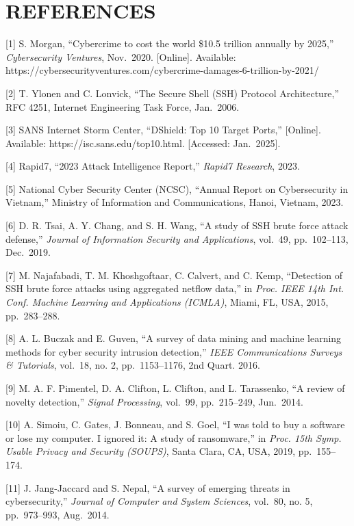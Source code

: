 \documentclass[
  a4paper]{report}
\begin{document}
\section{REFERENCES}\label{references}

{[}1{]} S. Morgan, ``Cybercrime to cost the world \$10.5 trillion
annually by 2025,'' \emph{Cybersecurity Ventures}, Nov.~2020.
{[}Online{]}. Available:
https://cybersecurityventures.com/cybercrime-damages-6-trillion-by-2021/

{[}2{]} T. Ylonen and C. Lonvick, ``The Secure Shell (SSH) Protocol
Architecture,'' RFC 4251, Internet Engineering Task Force, Jan.~2006.

{[}3{]} SANS Internet Storm Center, ``DShield: Top 10 Target Ports,''
{[}Online{]}. Available: https://isc.sans.edu/top10.html. {[}Accessed:
Jan.~2025{]}.

{[}4{]} Rapid7, ``2023 Attack Intelligence Report,'' \emph{Rapid7
Research}, 2023.

{[}5{]} National Cyber Security Center (NCSC), ``Annual Report on
Cybersecurity in Vietnam,'' Ministry of Information and Communications,
Hanoi, Vietnam, 2023.

{[}6{]} D. R. Tsai, A. Y. Chang, and S. H. Wang, ``A study of SSH brute
force attack defense,'' \emph{Journal of Information Security and
Applications}, vol.~49, pp.~102--113, Dec.~2019.

{[}7{]} M. Najafabadi, T. M. Khoshgoftaar, C. Calvert, and C. Kemp,
``Detection of SSH brute force attacks using aggregated netflow data,''
in \emph{Proc. IEEE 14th Int. Conf. Machine Learning and Applications
(ICMLA)}, Miami, FL, USA, 2015, pp.~283--288.

{[}8{]} A. L. Buczak and E. Guven, ``A survey of data mining and machine
learning methods for cyber security intrusion detection,'' \emph{IEEE
Communications Surveys \& Tutorials}, vol.~18, no. 2, pp.~1153--1176,
2nd Quart. 2016.

{[}9{]} M. A. F. Pimentel, D. A. Clifton, L. Clifton, and L. Tarassenko,
``A review of novelty detection,'' \emph{Signal Processing}, vol.~99,
pp.~215--249, Jun.~2014.

{[}10{]} A. Simoiu, C. Gates, J. Bonneau, and S. Goel, ``I was told to
buy a software or lose my computer. I ignored it: A study of
ransomware,'' in \emph{Proc. 15th Symp. Usable Privacy and Security
(SOUPS)}, Santa Clara, CA, USA, 2019, pp.~155--174.

{[}11{]} J. Jang-Jaccard and S. Nepal, ``A survey of emerging threats in
cybersecurity,'' \emph{Journal of Computer and System Sciences},
vol.~80, no. 5, pp.~973--993, Aug.~2014.
\end{document}
